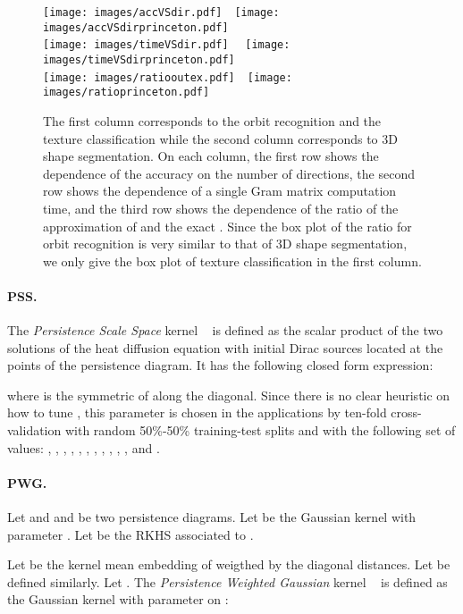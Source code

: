 \documentclass[11pt]{article}
\begin{document}
\begin{figure}\centering
\texttt{[image: images/accVSdir.pdf]}\ \ \texttt{[image: images/accVSdirprinceton.pdf]} \\
\texttt{[image: images/timeVSdir.pdf]} \ \ \texttt{[image: images/timeVSdirprinceton.pdf]} \\
\texttt{[image: images/ratiooutex.pdf]}\ \ \texttt{[image: images/ratioprinceton.pdf]}
\caption{\label{fig:plots} The first column corresponds to the orbit recognition and the texture classification while the second
column corresponds to 3D shape segmentation. 
On each column, the first row shows the dependence of the accuracy on the number of directions,
the second row shows the dependence of a single Gram matrix computation time, and the third row
shows the dependence of the ratio of the approximation of  and the exact .
Since the box plot of the ratio for orbit recognition is very similar to that of 3D shape segmentation,
we only give the box plot of texture classification in the first column. }
\end{figure}


\paragraph*{PSS.} The {\em Persistence Scale Space} kernel ~\cite{Reininghaus15} is
defined as the scalar product of the two solutions of the heat diffusion equation
with initial Dirac sources located at the points of the persistence diagram. It has the following closed form expression:

where  is the symmetric of  along the diagonal.
Since there is no clear heuristic on how to tune , this parameter is chosen in the applications 
by ten-fold cross-validation with random 50\%-50\%
training-test splits and with the following set of  values: , , , , 
, , , , , , ,  and . 

\paragraph*{PWG.} Let  and  and  be two persistence diagrams.
Let  be the Gaussian kernel with parameter .
Let  be the RKHS associated to .

Let  
be the kernel mean embedding of  weigthed by the diagonal distances.
Let  be defined similarly. Let .
The {\em Persistence Weighted Gaussian} kernel ~\cite{Kusano16, Kusano17} is
defined as the Gaussian kernel with parameter  on :
\end{document}
